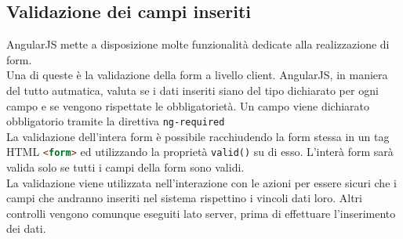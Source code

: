 \subsection{Validazione dei campi inseriti}

AngularJS mette a disposizione molte funzionalità dedicate alla realizzazione di form.\\
Una di queste è la validazione della form a livello client. AngularJS, in maniera del tutto autmatica, valuta se i dati inseriti siano del tipo dichiarato per ogni campo e se vengono rispettate le obbligatorietà. Un campo viene dichiarato obbligatorio tramite la direttiva \lstinline[language=HTML]!ng-required! \\
La validazione dell'intera form è possibile racchiudendo la form stessa in un tag HTML \lstinline[language=HTML]!<form>! ed utilizzando la proprietà \lstinline[language=HTML]!valid()! su di esso. L'interà form sarà valida solo se tutti i campi della form sono validi.	\\
La validazione viene utilizzata nell'interazione con le azioni per essere sicuri che i campi che andranno inseriti nel sistema rispettino i vincoli dati loro. Altri controlli vengono comunque eseguiti lato server, prima di effettuare l'inserimento dei dati.


